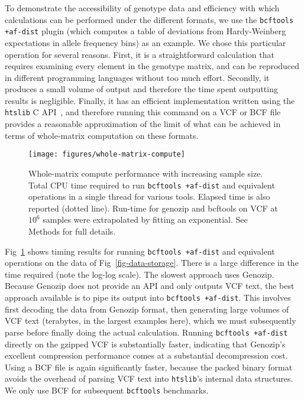 \documentclass[a4paper,num-refs]{oup-contemporary}
\begin{document}
To demonstrate the accessibility of genotype data and efficiency with
which calculations can be performed under the different formats,
we use the \texttt{bcftools +af-dist} plugin
(which computes a table of
deviations from Hardy-Weinberg expectations in
allele frequency bins) as an example.
We chose this particular operation for several reasons.
First, it is a straightforward calculation that
requires examining every element in the genotype matrix,
and can be reproduced in different programming languages
without too much effort.
Secondly, it produces a small volume of output  and therefore the
time spent outputting results is negligible.
Finally, it has an efficient implementation written using the
\texttt{htslib} C API~\citep{bonfield2021htslib},
and therefore running this command on a VCF or BCF file provides
a reasonable approximation of the limit of what can be achieved in terms
of whole-matrix computation on these formats.

\begin{figure}
\texttt{[image: figures/whole-matrix-compute]}
\caption{Whole-matrix compute performance with increasing sample size.
Total CPU time required to run \texttt{bcftools +af-dist}
and equivalent operations in a single thread for various tools.
Elapsed time is also reported (dotted line). Run-time for genozip
and bcftools on VCF
at $10^6$ samples were extrapolated by fitting an exponential.
See Methods for full details.
\label{fig-whole-matrix-compute}}
\end{figure}

Fig~\ref{fig-whole-matrix-compute} shows timing results
for running \texttt{bcftools +af-dist} and equivalent operations
on the data of Fig~\ref{fig-data-storage}. There is a large
difference in the time required (note the log-log scale).
The slowest approach uses Genozip. Because Genozip does not
provide an API and only outputs VCF text, the best approach available
is to pipe its output into \texttt{bcftools +af-dist}.
This involves first decoding the data from Genozip format,
then generating large volumes  of VCF text (terabytes, in the
largest examples here), which we must
subsequently parse before finally doing the actual calculation.
Running \texttt{bcftools +af-dist} directly on the gzipped VCF
is substantially faster, indicating that Genozip's excellent
compression performance comes at a substantial decompression cost.
Using a BCF file is again significantly faster,
because the packed binary format avoids the overhead of parsing
VCF text into \texttt{htslib}'s internal data structures.
We only use BCF for subsequent \texttt{bcftools} benchmarks.
\end{document}
